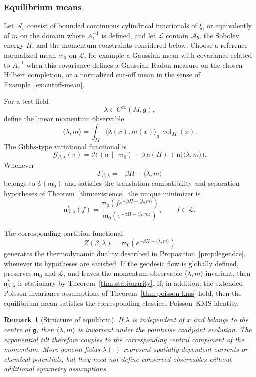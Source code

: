 \documentclass[11pt,reqno]{amsart}
\newtheorem{rem}[Theorem]{Remark}
\begin{document}
\subsubsection*{Equilibrium means}

Let $\mathcal A_b$ consist of bounded continuous cylindrical
functionals of $\xi$, or equivalently of $m$ on the domain where
$A_s^{-1}$ is defined, and let $\mathcal L$ contain $\mathcal A_b$, the
Sobolev energy $H$, and the momentum constraints considered below.
Choose a reference normalized mean $\mathsf m_0$ on $\mathcal L$, for
example a Gaussian mean with covariance related to $A_s^{-1}$ when this
covariance defines a Gaussian Radon measure on the chosen Hilbert
completion, or a normalized cut-off mean in the sense of
Example~\ref{ex:cutoff-mean}.

For a test field
\[
\lambda\in C^\infty(M,\mathfrak g),
\]
define the linear momentum observable
\[
\langle\lambda,m\rangle
=
\int_M
\langle\lambda(x),m(x)\rangle_{\mathfrak g}
\,\operatorname{vol}_M(x).
\]
The Gibbs-type variational functional is
\[
\mathcal G_{\beta,\lambda}(\mathsf n)
=
\mathcal H(\mathsf n\,\|\,\mathsf m_0)
+
\beta\,\mathsf n(H)
+
\mathsf n\bigl(\langle\lambda,m\rangle\bigr).
\]
Whenever
\[
F_{\beta,\lambda}
=
-\beta H-\langle\lambda,m\rangle
\]
belongs to $\mathcal E(\mathsf m_0)$ and satisfies the
translation-compatibility and separation hypotheses of
Theorem~\ref{thm:existence}, the unique minimizer is
\[
\boxed{
\mathsf n_{\beta,\lambda}^*(f)
=
\frac{
\mathsf m_0
\left(
f e^{-\beta H-\langle\lambda,m\rangle}
\right)
}{
\mathsf m_0
\left(
e^{-\beta H-\langle\lambda,m\rangle}
\right)
},
\qquad
f\in\mathcal L.
}
\]

The corresponding partition functional
\[
Z(\beta,\lambda)
=
\mathsf m_0
\left(
e^{-\beta H-\langle\lambda,m\rangle}
\right)
\]
generates the thermodynamic duality described in
Proposition~\ref{prop:legendre}, whenever its hypotheses are satisfied.
If the geodesic flow is globally defined, preserves $\mathsf m_0$ and
$\mathcal L$, and leaves the momentum observable
$\langle\lambda,m\rangle$ invariant, then
$\mathsf n_{\beta,\lambda}^*$ is stationary by
Theorem~\ref{thm:stationarity}. If, in addition, the extended
Poisson-invariance assumptions of Theorem~\ref{thm:poisson-kms} hold,
then the equilibrium mean satisfies the corresponding classical
Poisson--KMS identity.

\begin{rem}[Structure of equilibria]
If $\lambda$ is independent of $x$ and belongs to the centre of
$\mathfrak g$, then $\langle\lambda,m\rangle$ is invariant under the
pointwise coadjoint evolution. The exponential tilt therefore couples
to the corresponding central component of the momentum. More general
fields $\lambda(\cdot)$ represent spatially dependent currents or
chemical potentials, but they need not define conserved observables
without additional symmetry assumptions.
\end{rem}
\end{document}
